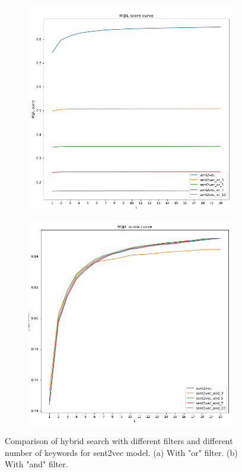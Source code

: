 \begin{figure}[htbp]
	\centering
	\begin{subfigure}[b]{0.48\textwidth}
		\centering
		\includegraphics[width=\textwidth]{figure/sent2vec_or.png}
		\caption{}
		\label{fig: hybrid_sent2vec_or}
	\end{subfigure}
	\hfill
	\begin{subfigure}[b]{0.48\textwidth}
		\centering
		\includegraphics[width=\textwidth]{figure/sent2vec_and.png}
		\caption{}
		\label{fig: hybrid_sent2vec_and}
	\end{subfigure}
	\hfill
	\caption[]{Comparison of hybrid search with different filters and different number of keywords for sent2vec model. (a) With "or" filter. (b) With "and" filter.}
	\label{fig: hybrid_sent2vec_and_or}
\end{figure}


